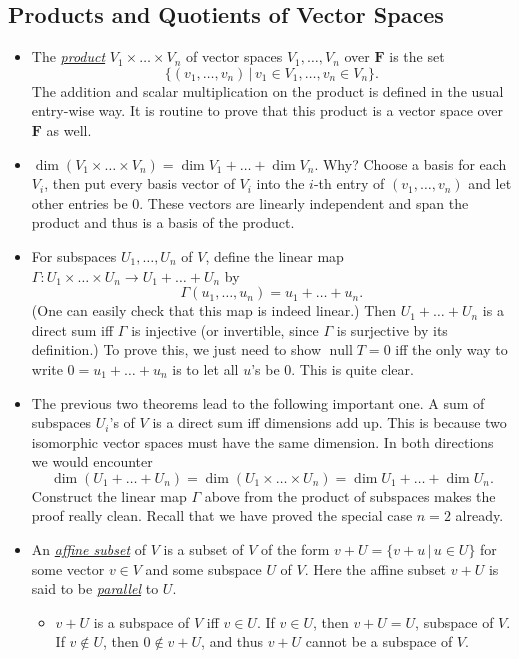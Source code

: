 \documentclass[11pt]{article}
\newcommand{\where}{\,|\,}
\newcommand{\df}[1]{\ul{\textit{\textsf{#1}}}}
\newcommand{\F}{\mathbf{F}}
\newcommand{\n}{\operatorname{null}}
\renewcommand{\d}{\dim}
\begin{document}
\subsection{Products and Quotients of Vector Spaces}
\begin{itemize}
    \item The \df{product} $V_1 \times \dots \times V_n$ of vector spaces $V_1,\dots,V_n$ over $\F$ is the set $$\{(v_1,\dots,v_n) \where v_1 \in V_1,\dots, v_n \in V_n\}.$$ The addition and scalar multiplication on the product is defined in the usual entry-wise way. It is routine to prove that this product is a vector space over $\F$ as well.
    \item $\d (V_1\times \dots \times V_n) = \d V_1 + \dots + \d V_n$. Why? Choose a basis for each $V_i$, then put every basis vector of $V_i$ into the $i$-th entry of $(v_1,\dots,v_n)$ and let other entries be 0. These vectors are linearly independent and span the product and thus is a basis of the product.
    \item For subspaces $U_1,\dots,U_n$ of $V$, define the linear map $\Gamma: U_1 \times \dots \times U_n \to U_1 + \dots + U_n$ by $$\Gamma(u_1,\dots,u_n) = u_1+\dots+u_n.$$ (One can easily check that this map is indeed linear.) Then $U_1+\dots+U_n$ is a direct sum iff $\Gamma$ is injective (or invertible, since $\Gamma$ is surjective by its definition.) To prove this, we just need to show $\n T = {0}$ iff the only way to write $0 = u_1+\dots+u_n$ is to let all $u$'s be 0. This is quite clear.
    \item The previous two theorems lead to the following important one. A sum of subspaces $U_i$'s of $V$ is a direct sum iff dimensions add up. This is because two isomorphic vector spaces must have the same dimension. In both directions we would encounter $$\d (U_1+\dots+U_n) = \d (U_1 \times \dots \times U_n) = \d U_1 + \dots + \d U_n.$$
    Construct the linear map $\Gamma$ above from the product of subspaces makes the proof really clean. Recall that we have proved the special case $n=2$ already.
    \item An \df{affine subset} of $V$ is a subset of $V$ of the form $v+U = \{v+u \where u \in U\}$ for some vector $v \in V$ and some subspace $U$ of $V$. Here the affine subset $v+U$ is said to be \df{parallel} to $U$.
    \begin{itemize}
        \item $v+U$ is a subspace of $V$ iff $v \in U$. If $v \in U$, then $v+U = U$, subspace of $V$. If $v \notin U$, then $0 \notin v+U$, and thus $v+U$ cannot be a subspace of $V$.

\end{itemize}
\end{itemize}
\end{document}
